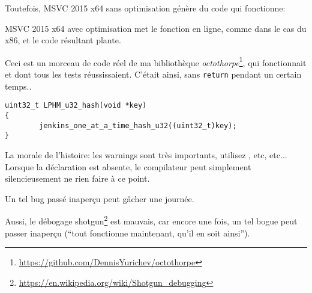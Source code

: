 

Toutefois, MSVC 2015 x64 sans optimisation génère du code qui fonctionne:



MSVC 2015 x64 avec optimisation met le fonction en ligne, comme dans le cas du x86,
et le code résultant plante.

\myhrule{}

Ceci est un morceau de code réel de ma bibliothèque \emph{octothorpe}\footnote{\url{https://github.com/DennisYurichev/octothorpe}},
qui fonctionnait et dont tous les tests réussissaient.
C'était ainsi, sans \verb|return| pendant un certain temps..


\begin{lstlisting}
uint32_t LPHM_u32_hash(void *key)
{
        jenkins_one_at_a_time_hash_u32((uint32_t)key);
}
\end{lstlisting}

\myhrule{}

La morale de l'histoire: les warnings sont très importants, utilisez , etc, etc...
Lorsque la déclaration  est absente, le compilateur peut simplement silencieusement
ne rien faire à ce point.

Un tel bug passé inaperçu peut gâcher une journée.

Aussi, le débogage shotgun\footnote{\url{https://en.wikipedia.org/wiki/Shotgun_debugging}}
est mauvais, car encore une fois, un tel bogue peut passer inaperçu (``tout fonctionne
maintenant, qu'il en soit ainsi'').
